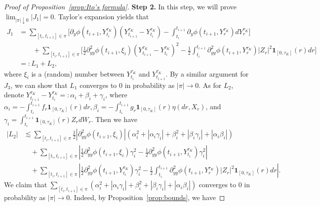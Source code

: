 \documentclass[10pt,a4paper]{amsart}
\begin{document}
\begin{proof}[Proof of Proposition~\ref{prop:Ito's formula}]
\textbf{ Step 2.} In this step, we will prove $\lim_{|\pi|\downarrow 0} |J_1|=0$. Taylor's expansion yields that
\begin{equation*}					
\begin{aligned}
J_{1} &= \sum_{[t_{i},t_{i+1}]\in\pi}\Big[ \partial_{y}\phi(t_{i+1},Y^{\tau_{K}}_{t_{i}})\left(Y^{\tau_{K}}_{t_{i+1}}-Y^{\tau_{K}}_{t_{i}}\right) - \int_{t_{i}}^{t_{i+1}}\partial_{y}\phi(t_{i+1},Y^{\tau_{K}}_{r})dY^{\tau_{K}}_{r}\Big]\\
&\qquad + \sum_{[t_{i},t_{i+1}]\in\pi}\Big[ \frac{1}{2} \partial^{2}_{yy}\phi(t_{i+1},\xi_{i})\left(Y^{\tau_{K}}_{t_{i+1}}-Y^{\tau_{K}}_{t_i}\right)^{2}  - \frac{1}{2}\int_{t_{i}}^{t_{i+1}}\partial^{2}_{yy}\phi(t_{i+1},Y^{\tau_{K}}_{r})|Z_{r}|^{2}\mathbf{1}_{[0,\tau_{K}]}(r)dr\Big]\\[1mm]
&=: L_{1} + L_{2},
\end{aligned}
\end{equation*}
where $\xi_{i}$ is a (random) number between $Y_{t_{i}}^{\tau_K}$ and $Y_{t_{i+1}}^{\tau_K}$. 
By a similar argument for $J_3$, we can show that $L_1$ converges to 0 in probability as $|\pi|\to0$. As for $L_{2}$, denote $Y^{\tau_{K}}_{t_{i+1}}-Y^{\tau_{K}}_{t_{i}} =: \alpha_i+\beta_i+\gamma_i$,
where $\alpha_i =  - \int_{t_i}^{t_{i+1}} f_{r} \mathbf{1}_{[0,\tau_{K}]}(r) dr, \beta_i= - \int_{t_i}^{t_{i+1}}g_{r} \mathbf{1}_{[0,\tau_{K}]}(r)\eta(dr,X_{r})$, and $\gamma_i= \int_{t_i}^{t_{i+1}} \mathbf{1}_{[0,\tau_{K}]}(r)Z_{r}dW_{r}.$ Then we have	
\begin{equation}\label{e:estimate-Ito}	
\begin{aligned}
|L_{2}| &\lesssim \sum_{[t_{i},t_{i+1}]\in\pi} \frac{1}{2} |\partial^{2}_{yy}\phi(t_{i+1},\xi_{i})|\left( \alpha_i^{2} +\left|\alpha_i\gamma_i\right| +\beta_i^{2} + \left|\beta_i\gamma_i\right| + |\alpha_i \beta_i|\right)\\
&\quad +\sum_{[t_{i},t_{i+1}]\in\pi}\left| \frac{1}{2} \partial^{2}_{yy}\phi(t_{i+1},\xi_{i}) \gamma_i^{2} - \frac{1}{2} \partial^{2}_{yy}\phi(t_{i+1},Y^{\tau_{K}}_{t_{i}}) \gamma_i^{2}\right|\\						
&\quad + \sum_{[t_{i},t_{i+1}]\in\pi}\left|\frac{1}{2} \partial^{2}_{yy}\phi(t_{i+1},Y^{\tau_{K}}_{t_{i}})  \gamma_i^{2}  - \frac{1}{2}\int_{t_{i}}^{t_{i+1}}\partial^{2}_{yy}\phi(t_{i+1},Y^{\tau_{K}}_{r})|Z_{r}|^{2}\mathbf{1}_{[0,\tau_{K}]}(r)dr\right|.
\end{aligned}
\end{equation}
We claim that $\sum_{[t_{i},t_{i+1}]\in\pi} \left( \alpha_i^{2} +\left|\alpha_i\gamma_i\right| +\beta_i^{2} + \left|\beta_i\gamma_i\right| + |\alpha_i \beta_i|\right)$ converges to 0 in probability as $|\pi|\to0$. Indeed, by Proposition~\ref{prop:bounds}, we have

\end{proof}
\end{document}

